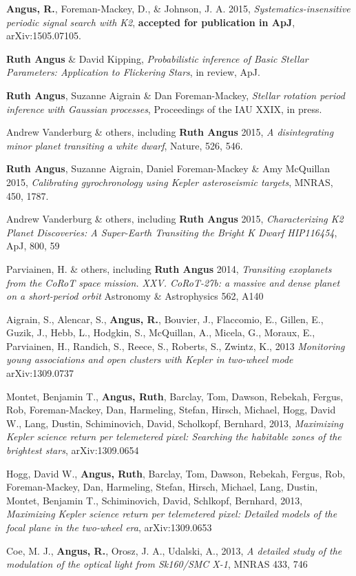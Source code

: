 \item
{\bf Angus, R.}, Foreman-Mackey, D., \& Johnson, J. A. 2015,
{\it Systematics-insensitive periodic signal search with K2}, {\bf accepted
for publication in ApJ}, arXiv:1505.07105.

\item
{\bf Ruth Angus} \& David Kipping, {\it Probabilistic inference of Basic
Stellar Parameters: Application to Flickering Stars}, in review, ApJ.

\item
{\bf Ruth Angus}, Suzanne Aigrain \& Dan Foreman-Mackey, {\it Stellar rotation
period inference with Gaussian processes}, Proceedings of the IAU XXIX, in
press.

\item
Andrew Vanderburg \& others, including {\bf Ruth Angus} 2015,
{\it A disintegrating minor planet transiting a white dwarf}, Nature, 526,
546.

\item
{\bf Ruth Angus}, Suzanne Aigrain, Daniel Foreman-Mackey \& Amy McQuillan
2015, {\it Calibrating gyrochronology using Kepler asteroseismic targets},
MNRAS, 450, 1787.

\item
Andrew Vanderburg \& others, including {\bf Ruth Angus} 2015,
{\it Characterizing K2 Planet Discoveries: A Super-Earth Transiting the
Bright K Dwarf HIP116454}, ApJ, 800, 59

\item
Parviainen, H. \& others, including {\bf Ruth Angus} 2014,
{\it Transiting exoplanets from the CoRoT space mission. XXV. CoRoT-27b: a
massive and dense planet on a short-period orbit} Astronomy \& Astrophysics
562, A140

\item
Aigrain, S., Alencar, S., {\bf Angus, R.}, Bouvier, J., Flaccomio, E., Gillen,
E., Guzik, J., Hebb, L., Hodgkin, S., McQuillan, A., Micela, G., Moraux, E.,
Parviainen, H., Randich, S., Reece, S., Roberts, S., Zwintz, K., 2013 {\it
Monitoring young associations and open clusters with Kepler in two-wheel mode}
arXiv:1309.0737

\item
Montet, Benjamin T., {\bf Angus, Ruth}, Barclay, Tom, Dawson, Rebekah, Fergus,
Rob, Foreman-Mackey, Dan, Harmeling, Stefan, Hirsch, Michael, Hogg, David W.,
Lang, Dustin, Schiminovich, David, Scholkopf, Bernhard, 2013, {\it Maximizing
Kepler science return per telemetered pixel: Searching the habitable zones of
the brightest stars}, arXiv:1309.0654

\item
Hogg, David W., {\bf Angus, Ruth}, Barclay, Tom, Dawson, Rebekah, Fergus, Rob,
Foreman-Mackey, Dan, Harmeling, Stefan, Hirsch, Michael, Lang, Dustin, Montet,
Benjamin T., Schiminovich, David, Schlkopf, Bernhard, 2013, {\it Maximizing
Kepler science return per telemetered pixel: Detailed models of the focal
plane in the two-wheel era}, arXiv:1309.0653

\item
Coe, M. J., {\bf Angus, R.}, Orosz, J. A., Udalski, A., 2013, {\it A detailed
study of the modulation of the optical light from Sk160/SMC X-1}, MNRAS 433,
746
